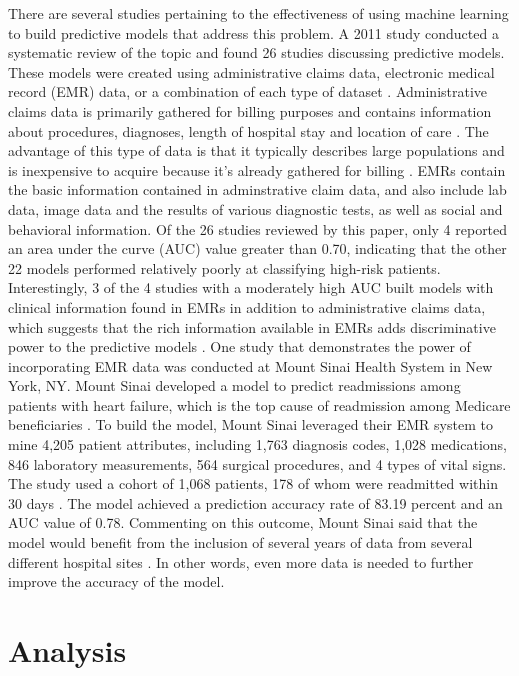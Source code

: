 \documentclass[sigconf]{acmart}
\begin{document}
There are several studies pertaining to the effectiveness of using machine learning to build predictive models that address this problem. A 2011 study conducted a systematic review of the topic and found 26 studies discussing predictive models. These models were created using administrative claims data, electronic medical record (EMR) data, or a combination of each type of dataset \cite{cite08}. Administrative claims data is primarily gathered for billing purposes and contains information about procedures, diagnoses, length of hospital stay and location of care \cite{cite10}. The advantage of this type of data is that it typically describes large populations and is inexpensive to acquire because it's already gathered for billing \cite{cite05}. EMRs contain the basic information contained in adminstrative claim data, and also include lab data, image data and the results of various diagnostic tests, as well as social and behavioral information. Of the 26 studies reviewed by this paper, only 4 reported an area under the curve (AUC) value greater than 0.70, indicating that the other 22 models performed relatively poorly at classifying high-risk patients. Interestingly, 3 of the 4 studies with a moderately high AUC built models with clinical information found in EMRs in addition to administrative claims data, which suggests that the rich information available in EMRs adds discriminative power to the predictive models \cite{cite05}.
One study that demonstrates the power of incorporating EMR data was conducted at Mount Sinai Health System in New York, NY. Mount Sinai developed a model to predict readmissions among patients with heart failure, which is the top cause of readmission among Medicare beneficiaries \cite{cite01}. To build the model, Mount Sinai leveraged their EMR system to mine 4,205 patient attributes, including 1,763 diagnosis codes, 1,028 medications, 846 laboratory measurements, 564 surgical procedures, and 4 types of vital signs. The study used a cohort of 1,068 patients, 178 of whom were readmitted within 30 days \cite{cite01}. The model achieved a prediction accuracy rate of 83.19 percent and an AUC value of 0.78. Commenting on this outcome, Mount Sinai said that the model would benefit from the inclusion of several years of data from several different hospital sites \cite{cite01}. In other words, even more data is needed to further improve the accuracy of the model.

\section{Analysis}
\end{document}
